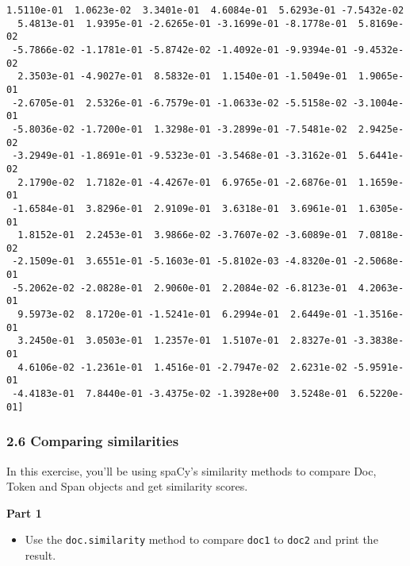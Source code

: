 \documentclass[11pt]{article}
\providecommand{\tightlist}{%
      \setlength{\itemsep}{0pt}\setlength{\parskip}{0pt}}
\begin{document}
\begin{Verbatim}[commandchars=\\\{\}]
  1.5110e-01  1.0623e-02  3.3401e-01  4.6084e-01  5.6293e-01 -7.5432e-02
  5.4813e-01  1.9395e-01 -2.6265e-01 -3.1699e-01 -8.1778e-01  5.8169e-02
 -5.7866e-02 -1.1781e-01 -5.8742e-02 -1.4092e-01 -9.9394e-01 -9.4532e-02
  2.3503e-01 -4.9027e-01  8.5832e-01  1.1540e-01 -1.5049e-01  1.9065e-01
 -2.6705e-01  2.5326e-01 -6.7579e-01 -1.0633e-02 -5.5158e-02 -3.1004e-01
 -5.8036e-02 -1.7200e-01  1.3298e-01 -3.2899e-01 -7.5481e-02  2.9425e-02
 -3.2949e-01 -1.8691e-01 -9.5323e-01 -3.5468e-01 -3.3162e-01  5.6441e-02
  2.1790e-02  1.7182e-01 -4.4267e-01  6.9765e-01 -2.6876e-01  1.1659e-01
 -1.6584e-01  3.8296e-01  2.9109e-01  3.6318e-01  3.6961e-01  1.6305e-01
  1.8152e-01  2.2453e-01  3.9866e-02 -3.7607e-02 -3.6089e-01  7.0818e-02
 -2.1509e-01  3.6551e-01 -5.1603e-01 -5.8102e-03 -4.8320e-01 -2.5068e-01
 -5.2062e-02 -2.0828e-01  2.9060e-01  2.2084e-02 -6.8123e-01  4.2063e-01
  9.5973e-02  8.1720e-01 -1.5241e-01  6.2994e-01  2.6449e-01 -1.3516e-01
  3.2450e-01  3.0503e-01  1.2357e-01  1.5107e-01  2.8327e-01 -3.3838e-01
  4.6106e-02 -1.2361e-01  1.4516e-01 -2.7947e-02  2.6231e-02 -5.9591e-01
 -4.4183e-01  7.8440e-01 -3.4375e-02 -1.3928e+00  3.5248e-01  6.5220e-01]

    \end{Verbatim}

    \hypertarget{comparing-similarities}{%
\subsubsection{2.6 Comparing
similarities}\label{comparing-similarities}}

In this exercise, you'll be using spaCy's similarity methods to compare
Doc, Token and Span objects and get similarity scores.

\textbf{Part 1}

\begin{itemize}
\tightlist
\item
  Use the \texttt{doc.similarity} method to compare \texttt{doc1} to
  \texttt{doc2} and print the result.
\end{itemize}
\end{document}
